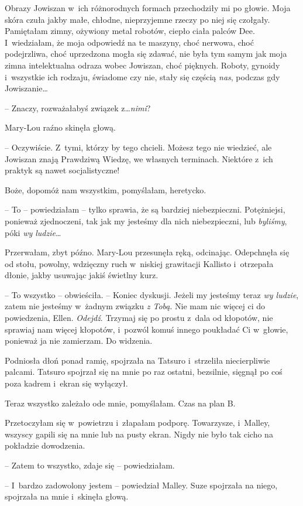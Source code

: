 \documentclass[oneside,polish,11pt,sfheadings]{mwbk}
\begin{document}
Obrazy Jowiszan w~ich różnorodnych formach przechodziły mi po głowie.
Moja skóra czuła jakby małe, chłodne, nieprzyjemne rzeczy po niej się
czołgały. Pamiętałam zimny, ożywiony metal robotów, ciepło ciała palców
Dee. I~wiedziałam, że moja odpowiedź na te maszyny, choć nerwowa, choć
podejrzliwa, choć uprzedzona mogła się zdawać, nie była tym samym jak
moja zimna intelektualna odraza wobec Jowiszan, choć pięknych. Roboty,
gynoidy i~wszystkie ich rodzaju, świadome czy nie, stały się częścią
\textit{nas}, podczas gdy Jowiszanie\ldots 

-- Znaczy, rozważałabyś związek z\ldots  \textit{nimi}?

Mary-Lou raźno skinęła głową. 

-- Oczywiście. Z~tymi, którzy by tego
chcieli. Możesz tego nie wiedzieć, ale Jowiszan znają Prawdziwą Wiedzę,
we własnych terminach. Niektóre z~ich praktyk są nawet socjalistyczne!

Boże, dopomóż nam wszystkim, pomyślałam, heretycko. 

-- To -- powiedziałam
-- tylko sprawia, że są bardziej niebezpieczni. Potężniejsi, ponieważ
zjednoczeni, tak jak my jesteśmy dla nich niebezpieczni, lub
\textit{byliśmy}, póki \textit{wy ludzie}\ldots 

Przerwałam, zbyt późno. Mary-Lou przesunęła ręką, odcinając. Odepchnęła
się od stołu, powolny, wdzięczny ruch w~niskiej grawitacji Kallisto i~otrzepała dłonie, jakby usuwając jakiś świetlny kurz.

-- To wszystko -- obwieściła. -- Koniec dyskusji. Jeżeli my jesteśmy teraz
\textit{wy ludzie}, zatem nie jesteśmy w~żadnym związku \textit{z Tobą}. Nie
mam nic więcej ci do powiedzenia, Ellen. \textit{Odejdź}. Trzymaj się po
prostu z~dala od kłopotów, nie sprawiaj nam więcej kłopotów, i~pozwól
komuś innego poukładać Ci w~głowie, ponieważ ja nie zamierzam. Do
widzenia.

Podniosła dłoń ponad ramię, spojrzała na Tatsuro i~strzeliła
niecierpliwie palcami. Tatsuro spojrzał się na mnie po raz ostatni,
bezsilnie, sięgnął po coś poza kadrem i~ekran się wyłączył.

Teraz wszystko zależało ode mnie, pomyślałam. Czas na plan B.

Przetoczyłam się w~powietrzu i~złapałam podporę. Towarzysze, i~Malley,
wszyscy gapili się na mnie lub na pusty ekran. Nigdy nie było tak cicho
na pokładzie dowodzenia.

-- Zatem to wszystko, zdaje się -- powiedziałam.

-- I~bardzo zadowolony jestem -- powiedział Malley. Suze spojrzała na
niego, spojrzała na mnie i~skinęła głową.
\end{document}
